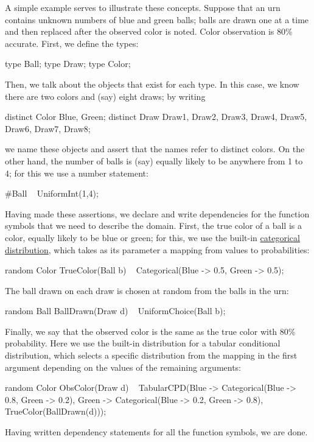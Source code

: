\documentclass[12pt]{article}
\begin{document}
A simple example serves to illustrate these concepts. Suppose that an urn contains unknown numbers of blue and green balls;
balls are drawn one at a time and then replaced after the observed color is noted. Color observation is 80\% accurate.
First, we define the types:
\begin{blogcode}
type Ball; type Draw; type Color;
\end{blogcode}
Then, we talk about the objects that exist for each type.
In this case, we know there are two colors and (say) eight draws; by writing
\begin{blogcode}
distinct Color Blue, Green;
distinct Draw Draw1, Draw2, Draw3, Draw4,
    Draw5, Draw6, Draw7, Draw8;
\end{blogcode}
we name these objects and assert that the names refer to distinct colors.
On the other hand, the number of balls is (say) equally likely to be anywhere from 1 to 4; for this we use a number statement:
\begin{blogcode}
#Ball ~ UniformInt(1,4);
\end{blogcode}
Having made these assertions, we declare and write dependencies for the function symbols
that we need to describe the domain. First, the true color of a ball is a color,
equally likely to be blue or green; for this, we use the built-in
\hyperref[categorical-section]{categorical distribution}, which takes as its parameter a mapping
from values to probabilities:
\begin{blogcode}
random Color TrueColor(Ball b) ~ Categorical({Blue -> 0.5, Green -> 0.5});
\end{blogcode}
The ball drawn on each draw is chosen at random from the balls in the urn:
\begin{blogcode}
random Ball BallDrawn(Draw d) ~ UniformChoice({Ball b});
\end{blogcode}
Finally, we say that the observed color is the same as the true color
with 80\% probability. Here we use the built-in distribution for a tabular 
conditional distribution, which selects a specific distribution from the mapping
in the first argument depending on the values of the remaining arguments:
\begin{blogcode}
random Color ObsColor(Draw d) 
       ~ TabularCPD({Blue -> Categorical({Blue -> 0.8, Green -> 0.2}),
                     Green -> Categorical({Blue -> 0.2, Green -> 0.8})},
                    TrueColor(BallDrawn(d)));
\end{blogcode}
Having written dependency statements for all the function symbols, we are done.
\end{document}
